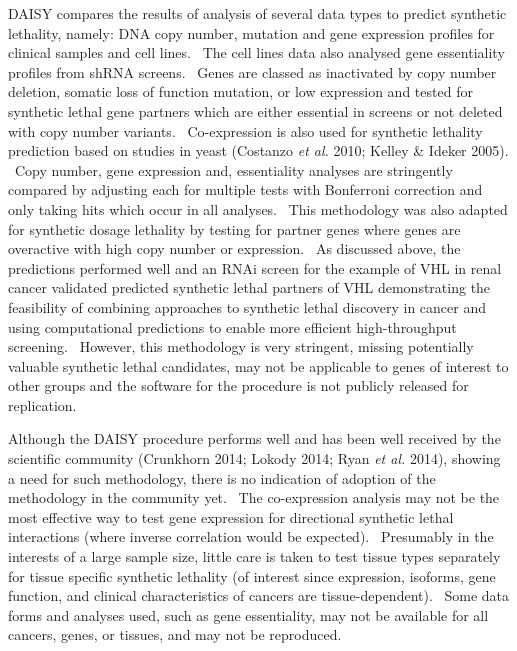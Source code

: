 DAISY compares the results of analysis of several data types to predict
synthetic lethality, namely: DNA copy number, mutation and gene
expression profiles for clinical samples and cell lines. \ The cell
lines data also analysed gene essentiality profiles from shRNA screens.
\ Genes are classed as inactivated by copy number deletion, somatic
loss of function mutation, or low expression and tested for synthetic
lethal gene partners which are either essential in screens or not
deleted with copy number variants. \ Co-expression is also used for
synthetic lethality prediction based on studies in yeast
(Costanzo\textit{ et al.} 2010; Kelley \& Ideker 2005). \ Copy number,
gene expression and, essentiality analyses are stringently compared by
adjusting each for multiple tests with Bonferroni correction and only
taking hits which occur in all analyses. \ This methodology was also
adapted for synthetic dosage lethality by testing for partner genes
where genes are overactive with high copy number or expression. \ As
discussed above, the predictions performed well and an RNAi screen for
the example of VHL in renal cancer validated predicted synthetic lethal
partners of VHL demonstrating the feasibility of combining approaches
to synthetic lethal discovery in cancer and using computational
predictions to enable more efficient high-throughput screening.
\ However, this methodology is very stringent, missing potentially
valuable synthetic lethal candidates, may not be applicable to genes of
interest to other groups and the software for the procedure is not
publicly released for replication. 


Although the DAISY procedure performs well and has been well received by
the scientific community (Crunkhorn 2014; Lokody 2014; Ryan\textit{ et
al.} 2014), showing a need for such methodology, there is no indication
of adoption of the methodology in the community yet. \ The
co-expression analysis may not be the most effective way to test gene
expression for directional synthetic lethal interactions (where inverse
correlation would be expected). \ Presumably in the interests of a
large sample size, little care is taken to test tissue types separately
for tissue specific synthetic lethality (of interest since expression,
isoforms, gene function, and clinical characteristics of cancers are
tissue-dependent). \ Some data forms and analyses used, such as gene
essentiality, may not be available for all cancers, genes, or tissues,
and may not be reproduced. \ 


